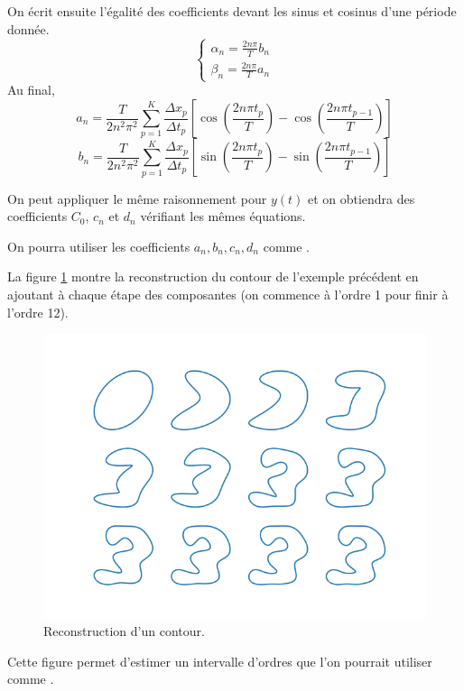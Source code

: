 On écrit ensuite l'égalité des coefficients devant les sinus et cosinus 
d'une période donnée.
\[
\begin{cases}
  \alpha_n = \frac{2n\pi}{T} b_n \\
  \beta_n = \frac{2n\pi}{T} a_n
\end{cases}
\]
Au final, 
\[
a_n = \frac{T}{2 n^2 \pi^2} \sum_{p = 1}^{K} \frac{\Delta x_p}{\Delta t_p} \left[ \cos\left(\frac{2n\pi t_p}{T}\right) - \cos\left(\frac{2n\pi t_{p-1}}{T}\right) \right]
\]
\[
b_n = \frac{T}{2 n^2 \pi^2} \sum_{p = 1}^{K} \frac{\Delta x_p}{\Delta t_p} \left[ \sin\left(\frac{2n\pi t_p}{T}\right) - \sin\left(\frac{2n\pi t_{p-1}}{T}\right) \right]
\]

On peut appliquer le même raisonnement pour $y(t)$ et on obtiendra des 
coefficients $C_0$, $c_n$ et $d_n$ vérifiant les mêmes équations.

On pourra utiliser les coefficients $a_n, b_n, c_n, d_n$ comme 
.

La figure \ref{fig:contour-reconstruction} montre la reconstruction 
du contour de l'exemple précédent en ajoutant à chaque étape des 
composantes (on commence à l'ordre 1 pour finir à l'ordre 12). 

\begin{figure}[h!]
  \centering
  \includegraphics[scale=0.8]{assets/fourier-contour-image12-reconstruction}
  \caption{Reconstruction d'un contour.}
  \label{fig:contour-reconstruction}
\end{figure}

Cette figure permet d'estimer un intervalle d'ordres que l'on pourrait 
utiliser comme .



